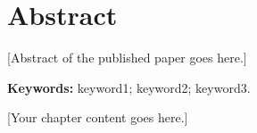 \section*{Abstract}

[Abstract of the published paper goes here.]

\textbf{Keywords:} keyword1; keyword2; keyword3.

\clearpage

[Your chapter content goes here.]

%
%
%
%
%
